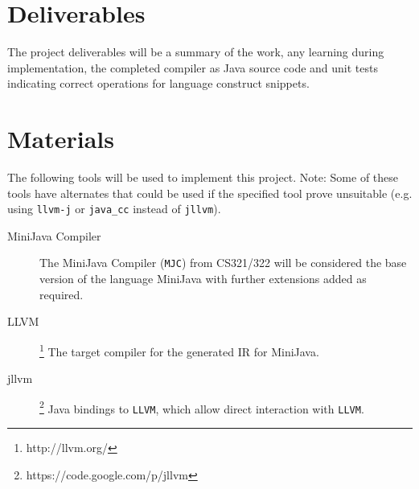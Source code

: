 \documentclass[11pt]{article}
\begin{document}
\section*{Deliverables}
The project deliverables will be a summary of the work, any learning during implementation, the completed compiler as Java source code and unit tests indicating correct operations for language construct snippets.


\section*{Materials}
The following tools will be used to implement this project. Note: Some of these tools have alternates that could be used if the specified tool prove unsuitable (e.g. using \texttt{llvm-j} or \texttt{java\_cc} instead of \texttt{jllvm}).

\begin{description}
\item[MiniJava Compiler]
	The MiniJava Compiler (\texttt{MJC}) from CS321/322 will be considered the base version of the language MiniJava with further extensions added as required.

\item[LLVM]\footnote{http://llvm.org/} The target compiler for the generated IR for MiniJava.

\item[jllvm]\footnote{https://code.google.com/p/jllvm}
Java bindings to \texttt{LLVM}, which allow direct interaction with \texttt{LLVM}.

\end{description}
\end{document}
